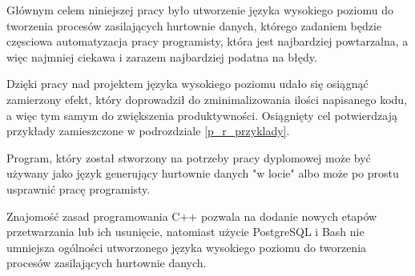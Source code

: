 Głównym celem niniejszej pracy było utworzenie języka wysokiego poziomu do tworzenia procesów zasilających hurtownie danych, 
 którego zadaniem będzie częsciowa automatyzacja pracy programisty,
 która jest najbardziej powtarzalna,
 a więc najmniej ciekawa i zarazem najbardziej podatna na błędy.

Dzięki pracy nad projektem języka wysokiego poziomu udało się osiągnąć zamierzony efekt,
 który doprowadził do zminimalizowania ilości napisanego kodu, 
 a więc tym samym do zwiększenia produktywności.
Osiągnięty cel potwierdzają przykłady zamieszczone w podrozdziale \ref{p_r_przyklady}.

Program, który został stworzony na potrzeby pracy dyplomowej może być używany jako język generujący
 hurtownie danych "w locie" albo może po prostu usprawnić pracę programisty.

Znajomość zasad programowania C++ pozwala na dodanie nowych etapów przetwarzania lub ich usunięcie,
 natomiast użycie PostgreSQL i Bash nie umniejsza ogólności utworzonego języka wysokiego poziomu
 do tworzenia procesów zasilających hurtownie danych.
